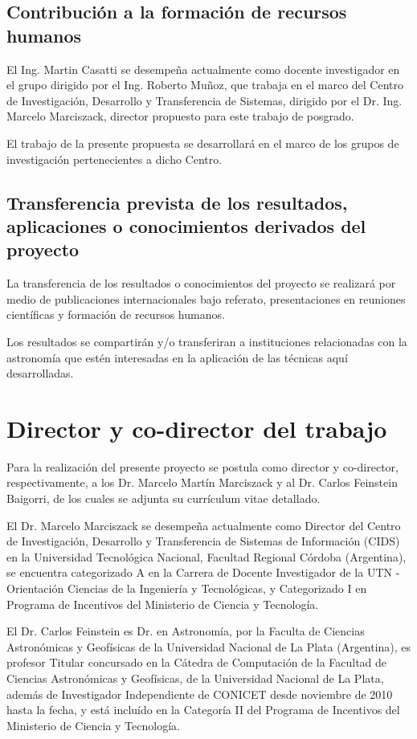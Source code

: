 \documentclass[
	11pt,oneside,a4paper,
	headsepline,footsepline,
	fleqn,
]{memoir}
\begin{document}
\subsection{Contribución a la formación de recursos humanos}

El Ing. Martin Casatti se desempeña actualmente como docente investigador en el grupo dirigido por el Ing. Roberto Muñoz, que trabaja en el marco del Centro de Investigación, Desarrollo y Transferencia de Sistemas, dirigido por el Dr. Ing. Marcelo Marciszack, director propuesto para este trabajo de posgrado.

El trabajo de la presente propuesta se desarrollará en el marco de los grupos de investigación pertenecientes a dicho Centro.

\subsection{Transferencia prevista de los resultados, aplicaciones o conocimientos derivados del proyecto}

La transferencia de los resultados o conocimientos del proyecto se realizará por medio de publicaciones internacionales bajo referato, presentaciones en reuniones científicas y formación de recursos humanos.

Los resultados se compartirán y/o transferiran a instituciones relacionadas con la astronomía que estén interesadas en la aplicación de las técnicas aquí desarrolladas.

\section{Director y co-director del trabajo}

Para la realización del presente proyecto se postula como director y co-director, respectivamente, a los Dr. Marcelo Martín Marciszack y al Dr. Carlos Feinstein Baigorri, de los cuales se adjunta su currículum vitae detallado.

El Dr. Marcelo Marciszack se desempeña actualmente como Director del Centro de Investigación, Desarrollo y Transferencia de Sistemas de Información (CIDS) en la Universidad Tecnológica Nacional, Facultad Regional Córdoba (Argentina), se encuentra categorizado A en la Carrera de Docente Investigador de la UTN -
Orientación Ciencias de la Ingeniería y Tecnológicas, y Categorizado I
en Programa de Incentivos del Ministerio de Ciencia y Tecnología.

El Dr. Carlos Feinstein es Dr. en Astronomía, por la Faculta de Ciencias Astronómicas y Geofísicas de la Universidad Nacional de La Plata (Argentina), es profesor Titular concursado en la Cátedra de Computación de la Facultad de Ciencias Astronómicas y Geofísicas, de la Universidad Nacional de La Plata, además de Investigador Independiente de CONICET desde noviembre de 2010 hasta la fecha, y está incluído en la Categoría II del Programa de Incentivos del Ministerio de Ciencia y Tecnología.
\end{document}
